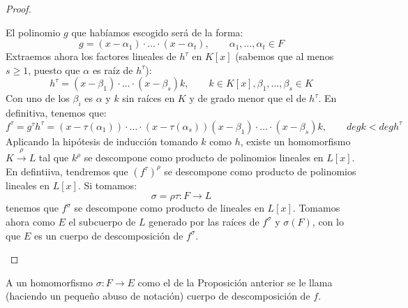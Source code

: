 \begin{prop}
\begin{proof}
\begin{itemize}
                El polinomio $g$ que habíamos escogido será de la forma:
                \begin{equation*}
                    g = (x-\alpha_1)\cdot  \ldots \cdot (x-\alpha_t), \qquad \alpha_1,\ldots,\alpha_t \in F
                \end{equation*}
                Extraemos ahora los factores lineales de $h^\tau$ en $K[x]$ (sabemos que al menos $s\geq 1$, puesto que $\alpha$ es raíz de $h^\tau$):
                \begin{equation*}
                    h^\tau = (x-\beta_1)\cdot \ldots\cdot (x-\beta_s)k, \qquad k\in K[x], \beta_1,\ldots,\beta_s\in K
                \end{equation*}
                Con uno de los $\beta_i$ es $\alpha$ y $k$ sin raíces en $K$ y de grado menor que el de $h^\tau$. En definitiva, tenemos que:
                \begin{equation*}
                    f^\tau = g^\tau h^\tau = (x-\tau(\alpha_1))\cdot  \ldots \cdot (x-\tau(\alpha_s))(x-\beta_1) \cdot \ldots \cdot (x-\beta_s)k, \qquad deg k < deg h^\tau
                \end{equation*}
                Aplicando la hipótesis de inducción tomando $k$ como $h$, existe un homomorfismo $K\stackrel{\rho}{\to}L$ tal que $k^\rho$  se descompone como producto de polinomios lineales en $L[x]$. En defintiiva, tendremos que ${(f^\tau)}^{\rho}$ se descompone como producto de polinomios lineales en $L[x]$. Si tomamos:
                \begin{equation*}
                    \sigma = \rho\tau : F\to L
                \end{equation*}
                tenemos que $f^\sigma$ se descompone como producto de lineales en $L[x]$. Tomamos ahora como $E$ el subcuerpo de $L$ generado por las raíces de $f^\sigma$ y $\sigma(F)$, con lo que $E$ es un cuerpo de descomposición de $f^\sigma$.
        \end{itemize}
    \end{proof}
\end{prop}

\begin{definicion}
    A un homomorfismo $\sigma:F\to E$ como el de la Proposición anterior se le llama (haciendo un pequeño abuso de notación) cuerpo de descomposición de $f$.
\end{definicion}

